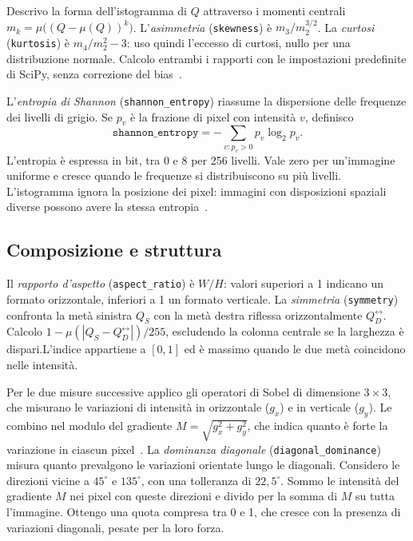 Descrivo la forma dell'istogramma di $Q$ attraverso i momenti centrali $m_k=\mu\bigl((Q-\mu(Q))^k\bigr)$. L'\emph{asimmetria} (\texttt{skewness}) è $m_3/m_2^{3/2}$. La \emph{curtosi} (\texttt{kurtosis}) è $m_4/m_2^2-3$: uso quindi l'eccesso di curtosi, nullo per una distribuzione normale. Calcolo entrambi i rapporti con le impostazioni predefinite di SciPy, senza correzione del bias~\cite{2020SciPy-NMeth}.

L'\emph{entropia di Shannon} (\texttt{shannon\_entropy}) riassume la dispersione delle frequenze dei livelli di grigio. Se $p_v$ è la frazione di pixel con intensità $v$, definisco
\begin{equation}
    \texttt{shannon\_entropy}=-\sum_{v:p_v>0}p_v\log_2 p_v.
    \label{eq:feature-entropia}
\end{equation}
L'entropia è espressa in bit, tra 0 e 8 per 256 livelli. Vale zero per un'immagine uniforme e cresce quando le frequenze si distribuiscono su più livelli. L'istogramma ignora la posizione dei pixel: immagini con disposizioni spaziali diverse possono avere la stessa entropia~\cite{6773024}.

\subsection{Composizione e struttura}
\label{subsec:feature-composizione}

Il \emph{rapporto d'aspetto} (\texttt{aspect\_ratio}) è $W/H$: valori superiori a 1 indicano un formato orizzontale, inferiori a 1 un formato verticale. La \emph{simmetria} (\texttt{symmetry}) confronta la metà sinistra $Q_S$ con la metà destra riflessa orizzontalmente $Q_D^{\leftrightarrow}$. Calcolo $1-\mu(|Q_S-Q_D^{\leftrightarrow}|)/255$, escludendo la colonna centrale se la larghezza è dispari.L'indice appartiene a $[0,1]$ ed è massimo quando le due metà coincidono nelle intensità.

Per le due misure successive applico gli operatori di Sobel di dimensione $3\times3$, che misurano le variazioni di intensità in orizzontale ($g_x$) e in verticale ($g_y$). Le combino nel modulo del gradiente $M=\sqrt{g_x^2+g_y^2}$, che indica quanto è forte la variazione in ciascun pixel~\cite{996}. La \emph{dominanza diagonale} (\texttt{diagonal\_dominance}) misura quanto prevalgono le variazioni orientate lungo le diagonali. Considero le direzioni vicine a $45^\circ$ e $135^\circ$, con una tolleranza di $22{,}5^\circ$. Sommo le intensità del gradiente $M$ nei pixel con queste direzioni e divido per la somma di $M$ su tutta l'immagine. Ottengo una quota compresa tra 0 e 1, che cresce con la presenza di variazioni diagonali, pesate per la loro forza.

